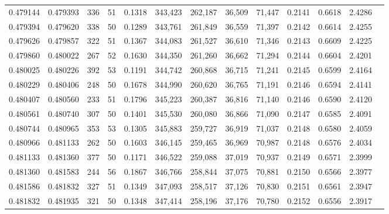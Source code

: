 \begin{tabular}{rrrrrrrrrrrrr}
0.479144 & 0.479393 &   336 &  51 &                                     0.1318 & 343,423 & 262,187 &  36,509 &  71,447 & 0.2141 & 0.6618 & 2.4286 \\
0.479394 & 0.479620 &   338 &  50 &                                     0.1289 & 343,761 & 261,849 &  36,559 &  71,397 & 0.2142 & 0.6614 & 2.4255 \\
0.479626 & 0.479857 &   322 &  51 &                                     0.1367 & 344,083 & 261,527 &  36,610 &  71,346 & 0.2143 & 0.6609 & 2.4225 \\
0.479860 & 0.480022 &   267 &  52 &                                     0.1630 & 344,350 & 261,260 &  36,662 &  71,294 & 0.2144 & 0.6604 & 2.4201 \\
0.480025 & 0.480226 &   392 &  53 &                                     0.1191 & 344,742 & 260,868 &  36,715 &  71,241 & 0.2145 & 0.6599 & 2.4164 \\
0.480229 & 0.480406 &   248 &  50 &                                     0.1678 & 344,990 & 260,620 &  36,765 &  71,191 & 0.2146 & 0.6594 & 2.4141 \\
0.480407 & 0.480560 &   233 &  51 &                                     0.1796 & 345,223 & 260,387 &  36,816 &  71,140 & 0.2146 & 0.6590 & 2.4120 \\
0.480561 & 0.480740 &   307 &  50 &                                     0.1401 & 345,530 & 260,080 &  36,866 &  71,090 & 0.2147 & 0.6585 & 2.4091 \\
0.480744 & 0.480965 &   353 &  53 &                                     0.1305 & 345,883 & 259,727 &  36,919 &  71,037 & 0.2148 & 0.6580 & 2.4059 \\
0.480966 & 0.481133 &   262 &  50 &                                     0.1603 & 346,145 & 259,465 &  36,969 &  70,987 & 0.2148 & 0.6576 & 2.4034 \\
0.481133 & 0.481360 &   377 &  50 &                                     0.1171 & 346,522 & 259,088 &  37,019 &  70,937 & 0.2149 & 0.6571 & 2.3999 \\
0.481360 & 0.481583 &   244 &  56 &                                     0.1867 & 346,766 & 258,844 &  37,075 &  70,881 & 0.2150 & 0.6566 & 2.3977 \\
0.481586 & 0.481832 &   327 &  51 &                                     0.1349 & 347,093 & 258,517 &  37,126 &  70,830 & 0.2151 & 0.6561 & 2.3947 \\
0.481832 & 0.481935 &   321 &  50 &                                     0.1348 & 347,414 & 258,196 &  37,176 &  70,780 & 0.2152 & 0.6556 & 2.3917 \\

\end{tabular}
